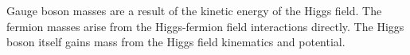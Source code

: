 

Gauge boson masses are a result of the kinetic energy of the Higgs field. The fermion masses arise from the Higgs-fermion field interactions directly. The Higgs boson itself gains mass from the Higgs field kinematics and potential.


